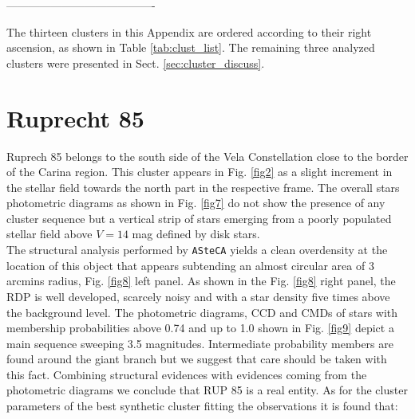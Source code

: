 \documentclass[draft]{aa}
\begin{document}
----------------------------------------




















































\appendix

The thirteen clusters in this Appendix are ordered according to their right
ascension, as shown in Table \ref{tab:clust_list}. The remaining three analyzed
clusters were presented in Sect. \ref{sec:cluster_discuss}.

\section{Ruprecht 85}

Ruprech 85 belongs to the south side of the Vela Constellation close to the
border of the Carina region. This cluster appears in Fig. \ref{fig2} as a slight
increment in the stellar field towards the north part in the respective frame.
The overall stars photometric diagrams as shown in Fig. \ref{fig7} do not show
the presence of any cluster sequence but a vertical strip of stars emerging from
a poorly populated stellar field above $V= 14$ mag defined by disk stars.\\

The structural analysis performed by \texttt{ASteCA} yields a clean overdensity
at the location of this object that appears subtending an almost circular area
of 3 arcmins radius, Fig. \ref{fig8} left panel. As shown in the Fig. \ref{fig8}
right panel, the RDP is well developed, scarcely noisy and with a star density
five times above the background level. The photometric diagrams, CCD and CMDs of
stars with membership probabilities above 0.74 and up to 1.0 shown in Fig.
\ref{fig9} depict a main sequence sweeping 3.5 magnitudes. Intermediate
probability members are found around the giant branch but we suggest that
care should be taken with this fact. Combining structural evidences with
evidences coming from the photometric diagrams we conclude that RUP 85 is a
real entity. As for the cluster parameters of the best synthetic cluster
fitting the observations it is found that:
\end{document}
